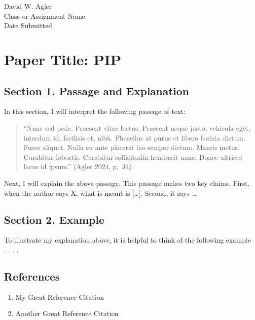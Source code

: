 David W. Agler\\
Class or Assignment Name\\
Date Submitted

\section{Paper Title: PIP}\label{paper-title-pip}

\subsection{Section 1. Passage and
Explanation}\label{section-1.-passage-and-explanation}

In this section, I will interpret the following passage of text:

\begin{quote}
``Nunc sed pede. Praesent vitae lectus. Praesent neque justo, vehicula
eget, interdum id, facilisis et, nibh. Phasellus at purus et libero
lacinia dictum. Fusce aliquet. Nulla eu ante placerat leo semper dictum.
Mauris metus. Curabitur lobortis. Curabitur sollicitudin hendrerit nunc.
Donec ultrices lacus id ipsum.'' (Agler 2024, p.~34)
\end{quote}

Next, I will explain the above passage. This passage makes two key
claims. First, when the author says X, what is meant is {[}\ldots{]}.
Second, it says \ldots{}

\subsection{Section 2. Example}\label{section-2.-example}

To illustrate my explanation above, it is helpful to think of the
following example . . . .

\subsection{References}\label{references}

\begin{enumerate}
\def\labelenumi{\arabic{enumi}.}
\tightlist
\item
  My Great Reference Citation
\item
  Another Great Reference Citation
\end{enumerate}
